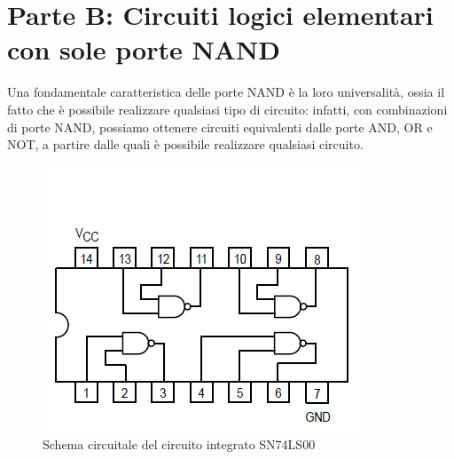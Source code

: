 \documentclass[10pt, a4paper, italian]{article}
\begin{document}
\section*{Parte B: Circuiti logici elementari con sole porte NAND}
Una fondamentale caratteristica delle porte NAND è la loro universalità, ossia il fatto che è possibile realizzare qualsiasi tipo di circuito: infatti, con combinazioni di porte NAND, possiamo ottenere circuiti equivalenti dalle porte AND, OR e NOT, a partire dalle quali è possibile realizzare qualsiasi circuito.

\begin{figure}
    \includegraphics[width=\textwidth]{NAND}
    \caption{Schema circuitale del circuito integrato SN74LS00}
    \label{fig: NAND}
\end{figure}
\end{document}
